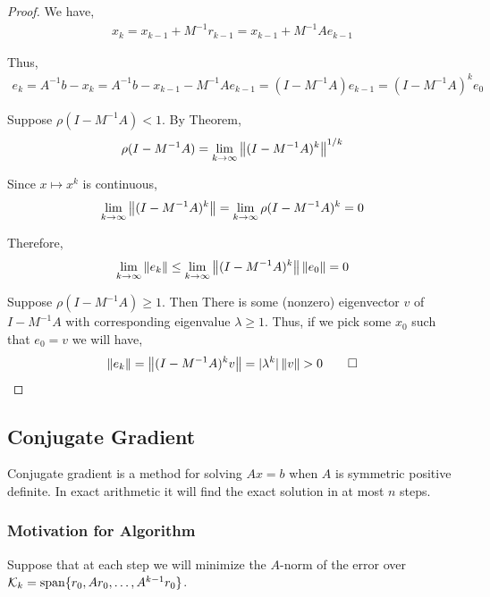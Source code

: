 \documentclass[12pt]{article}
\begin{document}
\begin{proof}
We have,
\begin{align*}
    x_k = x_{k-1} + M^{-1} r_{k-1}
    = x_{k-1} + M^{-1} Ae_{k-1}
\end{align*}

Thus,
\begin{align*}
    e_k = A^{-1}b-x_k = A^{-1}b-x_{k-1} - M^{-1}Ae_{k-1}
    = (I-M^{-1}A)e_{k-1}
    = (I-M^{-1}A)^k e_0
\end{align*}

Suppose \( \rho(I-M^{-1}A) < 1 \). By Theorem,
\begin{align*}
    \rho(I-M^{-1}A) = \lim_{k\to\infty} \left\lVert(I-M^{-1}A)^k\right\rVert^{1/k}
\end{align*}

Since \( x\mapsto x^k \) is continuous,
\begin{align*}
    \lim_{k\to\infty} \left\lVert(I-M^{-1}A)^k\right\rVert
    = \lim_{k\to\infty} \rho(I-M^{-1}A)^k  = 0
\end{align*}

Therefore,
\begin{align*}
    \lim_{k\to\infty} \left\lVert e_k\right\rVert \leq \lim_{k\to\infty} \left\lVert(I-M^{-1}A)^k\right\rVert\left\lVert e_0\right\rVert = 0
\end{align*}

Suppose \( \rho(I-M^{-1}A) \geq 1 \). Then There is some (nonzero) eigenvector \( v \) of \( I-M^{-1}A \) with corresponding eigenvalue \( \lambda \geq 1 \). Thus, if we pick some \( x_0 \) such that \( e_0 = v \) we will have,
\begin{align*}
    \norm{e_k} = \norm{(I-M^{-1}A)^kv} = |\lambda^k| \norm{v} > 0 \tag*{\qed}
\end{align*}
\end{proof}

\subsection{Conjugate Gradient}
Conjugate gradient is a method for solving \( Ax=b \) when \( A \) is symmetric positive definite. In exact arithmetic it will find the exact solution in at most \( n \) steps.

\subsubsection{Motivation for Algorithm}

Suppose that at each step we will minimize the \( A \)-norm of the error over \( \mathcal{K}_k = \operatorname{span}\{r_0,Ar_0, \ldots, A^{k-1}r_0\} \).
\end{document}
